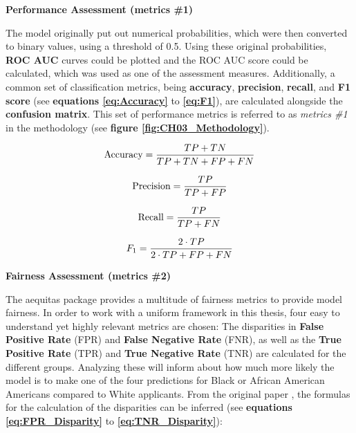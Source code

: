 \textbf{Performance Assessment (metrics \#1)}

The model originally put out numerical probabilities, which were then converted to binary values, using a threshold of 0.5.
Using these original probabilities, \textbf{ROC AUC} curves could be plotted and the ROC AUC score could be calculated, which was used as one of the assessment measures.
Additionally, a common set of classification metrics, being \textbf{accuracy}, \textbf{precision}, \textbf{recall}, and \textbf{F1 score} (see \textbf{equations \ref{eq:Accuracy}} to \textbf{\ref{eq:F1}}), are calculated alongside the \textbf{confusion matrix}.
This set of performance metrics is referred to as \textit{metrics \#1} in the methodology (see \textbf{figure \ref{fig:CH03_Methodology}}).

\begin{equation}
    \text{Accuracy} = \frac{TP + TN}{TP + TN + FP + FN}
    \label{eq:Accuracy}
    \addcontentsline{frm}{formulas}{\protect\numberline{\theequation}\hspace{1em}Accuracy}
\end{equation}

\begin{equation}
    \text{Precision} = \frac{TP}{TP + FP}
    \label{eq:Precision}
    \addcontentsline{frm}{formulas}{\protect\numberline{\theequation}\hspace{1em}Precision}
\end{equation}

\begin{equation}
    \text{Recall} = \frac{TP}{TP + FN}
    \label{eq:Recall}
    \addcontentsline{frm}{formulas}{\protect\numberline{\theequation}\hspace{1em}Recall}
\end{equation}

\begin{equation}
    F_1 = \frac{2 \cdot TP}{2 \cdot TP + FP + FN}
    \label{eq:F1}
    \addcontentsline{frm}{formulas}{\protect\numberline{\theequation}\hspace{1em}F1 Score}
\end{equation}

\textbf{Fairness Assessment (metrics \#2)}

The aequitas package provides a multitude of fairness metrics to provide model fairness. In order to work with a uniform framework in this thesis, four easy to understand yet highly relevant metrics are chosen: 
The disparities in \textbf{False Positive Rate} (FPR) and \textbf{False Negative Rate} (FNR), as well as the \textbf{True Positive Rate} (TPR) and \textbf{True Negative Rate} (TNR) are calculated for the different groups.
Analyzing these will inform about how much more likely the model is to make one of the four predictions for Black or African American Americans compared to White applicants.
From the original paper \parencite{2018aequitas}, the formulas for the calculation of the disparities can be inferred (see \textbf{equations \ref{eq:FPR_Disparity}} to \textbf{\ref{eq:TNR_Disparity}}):

